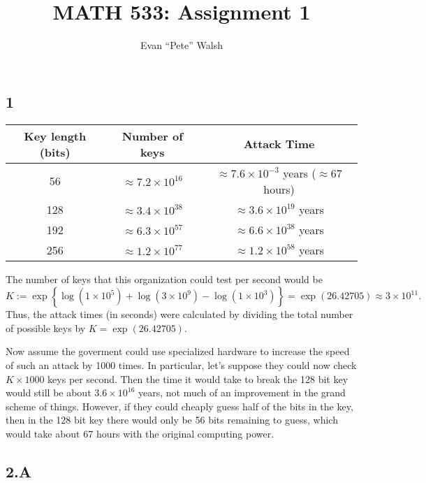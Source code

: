 \documentclass[12pt]{article}
\title{MATH 533: Assignment 1}
\author{Evan ``Pete'' Walsh}
\begin{document}
\maketitle


\subsection*{1}
\begin{table}[h!]
  \centering
  \begin{tabular}{c|c|c}
    Key length (bits) & Number of keys & Attack Time \\
    \hline 
    56 & $\approx 7.2\times 10^{16}$ & $\approx 7.6\times 10^{-3}$ years ($\approx 67$ hours) \\
    128 & $\approx 3.4\times 10^{38}$ & $\approx 3.6 \times 10^{19}$ years \\
    192 & $\approx 6.3\times 10^{57}$ & $\approx 6.6 \times 10^{38}$ years \\
    256 & $\approx 1.2\times 10^{77}$ & $\approx 1.2 \times 10^{58}$ years \\
  \end{tabular}
\end{table}

The number of keys that this organization could test per second would be 
\[
  K := \exp\left\{\log(1\times 10^5) + \log(3\times 10^{9}) - \log(1\times 10^{3})\right\} = \exp(26.42705) \approx 3\times 10^{11}.
\]
Thus, the attack times (in seconds) were calculated by dividing the total number of possible keys by
$K = \exp(26.42705)$.

Now assume the goverment could use specialized hardware to increase the speed of such an attack by 1000 times. In particular,
let's suppose they could now check $K \times 1000$ keys per second. Then the time it would take to break the 128 bit key would 
still be about $3.6\times 10^{16}$ years, not much of an improvement in the grand scheme of things.
However, if they could cheaply guess half of the bits in the key, then in the 128 bit key there would only be 56 bits remaining to guess,
which would take about 67 hours with the original computing power.


\newpage
\subsection*{2.A}
\end{document}
